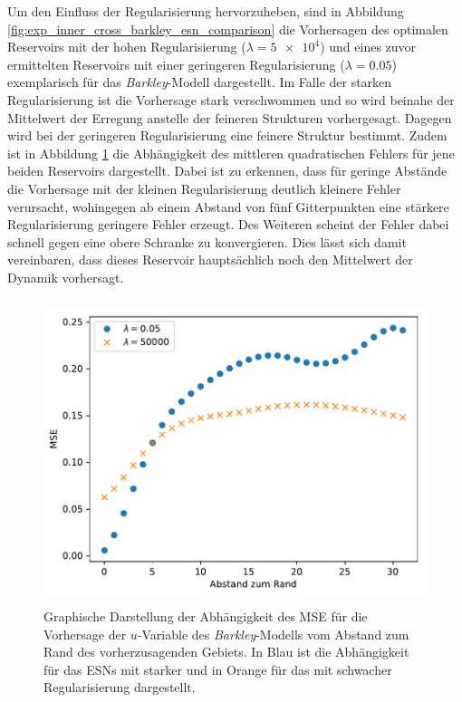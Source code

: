 Um den Einfluss der Regularisierung hervorzuheben, sind in Abbildung \ref{fig:exp_inner_cross_barkley_esn_comparison} die Vorhersagen des optimalen Reservoirs mit der hohen Regularisierung ($\lambda=\num{5e4}$) und eines zuvor ermittelten Reservoirs mit einer geringeren Regularisierung ($\lambda=0.05$) exemplarisch für das \textit{Barkley}-Modell dargestellt.
Im Falle der starken Regularisierung ist die Vorhersage stark verschwommen und so wird beinahe der Mittelwert der Erregung anstelle der feineren Strukturen vorhergesagt. Dagegen wird bei der geringeren Regularisierung eine feinere Struktur bestimmt. 
Zudem ist in Abbildung \ref{fig:exp_inner_cross_barkley_esn_error_dependency_comparison} die Abhängigkeit des mittleren quadratischen Fehlers für jene beiden Reservoirs dargestellt. Dabei ist zu erkennen, dass für geringe Abstände die Vorhersage mit der kleinen Regularisierung deutlich kleinere Fehler verursacht, wohingegen ab einem Abstand von fünf Gitterpunkten eine stärkere Regularisierung geringere Fehler erzeugt. Des Weiteren scheint der Fehler dabei schnell gegen eine obere Schranke zu konvergieren. Dies lässt sich damit vereinbaren, dass dieses Reservoir hauptsächlich noch den Mittelwert der Dynamik vorhersagt.

\begin{figure}[h]
	\centering
	\includegraphics[height=3.5in]{figures/results/inner_cross_prediction/inner_errors.pdf}
	\setcapmargin[1cm]{0.5cm}
	\caption{Graphische Darstellung der Abhängigkeit des MSE für die Vorhersage der $u$-Variable des \textit{Barkley}-Modells vom Abstand zum Rand des vorherzusagenden Gebiets. In Blau ist die Abhängigkeit für das \textsc{ESN}s mit starker und in Orange für das mit schwacher Regularisierung dargestellt.}
	\label{fig:exp_inner_cross_barkley_esn_error_dependency_comparison}
\end{figure} 


